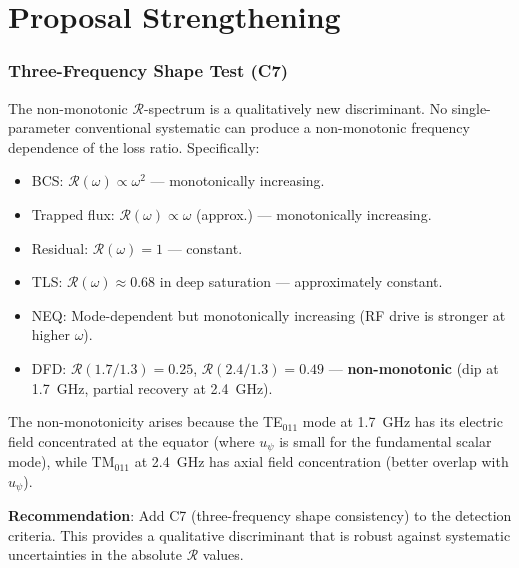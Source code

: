 \documentclass[11pt]{article}
\theoremstyle{definition}
\theoremstyle{remark}
\begin{document}
\part{Proposal Strengthening}
\label{part:strengthening}


\section{Three-Frequency Shape Test (C7)}
\label{sec:c7}

The non-monotonic $\mathcal{R}$-spectrum is a qualitatively new
discriminant. No single-parameter conventional systematic can produce
a non-monotonic frequency dependence of the loss ratio. Specifically:

\begin{itemize}[nosep]
\item BCS: $\mathcal{R}(\omega) \propto \omega^2$ --- monotonically
  increasing.
\item Trapped flux: $\mathcal{R}(\omega) \propto \omega$ (approx.)
  --- monotonically increasing.
\item Residual: $\mathcal{R}(\omega) = 1$ --- constant.
\item TLS: $\mathcal{R}(\omega) \approx 0.68$ in deep saturation ---
  approximately constant.
\item NEQ: Mode-dependent but monotonically increasing (RF drive
  is stronger at higher $\omega$).
\item DFD: $\mathcal{R}(1.7/1.3) = 0.25$, $\mathcal{R}(2.4/1.3)
  = 0.49$ --- \textbf{non-monotonic} (dip at 1.7~GHz, partial
  recovery at 2.4~GHz).
\end{itemize}

The non-monotonicity arises because the TE$_{011}$ mode at 1.7~GHz
has its electric field concentrated at the equator (where $u_\psi$
is small for the fundamental scalar mode), while TM$_{011}$ at
2.4~GHz has axial field concentration (better overlap with $u_\psi$).

\textbf{Recommendation}: Add C7 (three-frequency shape consistency)
to the detection criteria. This provides a qualitative discriminant
that is robust against systematic uncertainties in the absolute
$\mathcal{R}$ values.
\end{document}
